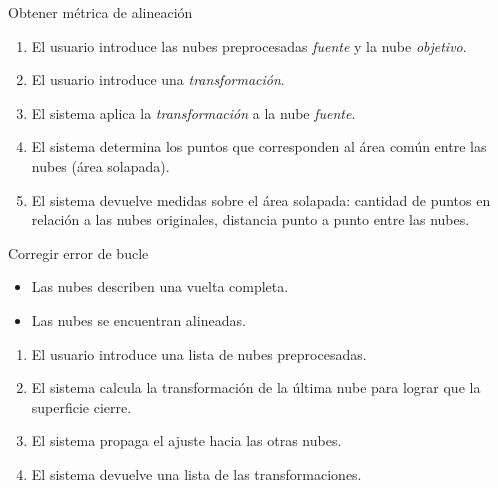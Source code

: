 \begin{CasoDeUso}{Obtener métrica de alineación}
	\CUNormal
	\begin{enumerate}
		\item El usuario introduce las nubes preprocesadas \emph{fuente} y la nube \emph{objetivo}. 
		\item El usuario introduce una \emph{transformación}.
		\item El sistema aplica la \emph{transformación} a la nube \emph{fuente}.
		\item El sistema determina los puntos que corresponden al área común entre las nubes (área solapada).
		\item El sistema devuelve medidas sobre el área solapada:
			cantidad de puntos en relación a las nubes originales,
			distancia punto a punto entre las nubes.
	\end{enumerate}
\end{CasoDeUso}


\begin{CasoDeUso}{Corregir error de bucle}
	\begin{itemize}
		\item Las nubes describen una vuelta completa.
		\item Las nubes se encuentran alineadas.
	\end{itemize}
	\CUNormal
	\begin{enumerate}
		\item El usuario introduce una lista de nubes preprocesadas. 
		\item El sistema calcula la transformación de la última nube para lograr que la superficie cierre. 
		\item El sistema propaga el ajuste hacia las otras nubes.
		\item El sistema devuelve una lista de las transformaciones.
	\end{enumerate}
\end{CasoDeUso}

